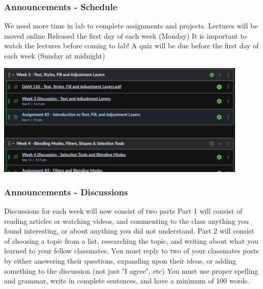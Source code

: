 \documentclass{beamer}
\begin{document}
\begin{frame}
	\frametitle{Announcements - Schedule}
	\begin{outline}
		\1 We need more time in lab to complete assignments and projects.
		\1 Lectures will be moved online
		\2 Released the first day of each week (Monday)
		\1 It is important to watch the lectures before coming to lab!
		\2 A quiz will be due before the first day of each week (Sunday at midnight)
	\end{outline}
\begin{center}
				\includegraphics[width = 0.9\textwidth]{images/schedule.png}
\end{center}
\end{frame}

\begin{frame}
	\frametitle{Announcements - Discussions}
	\begin{outline}
		\1 Discussions for each week will now consist of two parts
		\2 Part 1 will consist of reading articles or watching videos, and commenting to the class anything you found interesting, or about anything you did not understand.
		\2 Part 2 will consist of choosing a topic from a list, researching the topic, and writing about what you learned to your fellow classmates.
		\1 You must reply to two of your classmates posts by either answering their questions, expanding upon their ideas, or adding something to the discussion (not just "I agree", etc)
		\1 You must use proper spelling and grammar, write in complete sentences, and have a minimum of 100 words.
	\end{outline}
\end{frame}
\end{document}
